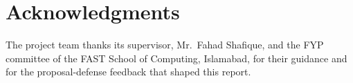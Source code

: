 \chapter*{Acknowledgments}
The project team thanks its supervisor, Mr.\ Fahad Shafique, and the FYP committee of the FAST School of Computing,
Islamabad, for their guidance and for the proposal-defense feedback that shaped this report.

